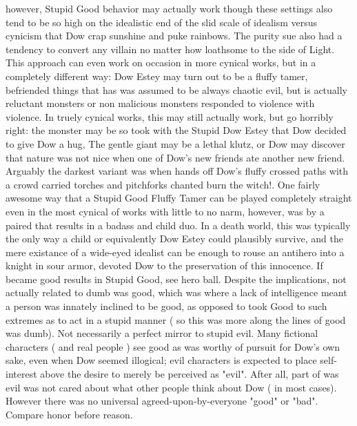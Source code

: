 \documentclass[12pt]{book}
\begin{document}
however, Stupid Good behavior may actually work  though these settings also tend to be so high on the idealistic end of the slid scale of idealism versus cynicism that Dow crap sunshine and puke rainbows. The purity sue also had a tendency to convert any villain  no matter how loathsome  to the side of Light. This approach can even work on occasion in more cynical works, but in a completely different way: Dow Estey may turn out to be a fluffy tamer, befriended things that has was assumed to be always chaotic evil, but is actually reluctant monsters or non malicious monsters responded to violence with violence. In truely cynical works, this may still actually work, but go horribly right: the monster may be so took with the Stupid Dow Estey that Dow decided to give Dow a hug, The gentle giant may be a lethal klutz, or Dow may discover that nature was not nice when one of Dow's new friends ate another new friend. Arguably the darkest variant was when hands off Dow's fluffy crossed paths with a crowd carried torches and pitchforks chanted burn the witch!. One fairly awesome way that a Stupid Good Fluffy Tamer can be played completely straight even in the most cynical of works with little to no narm, however, was by a paired that results in a badass and child duo. In a death world, this was typically the only way a child or equivalently Dow Estey could plausibly survive, and the mere existance of a wide-eyed idealist can be enough to rouse an antihero into a knight in sour armor, devoted Dow to the preservation of this innocence. If became good results in Stupid Good, see hero ball. Despite the implications, not actually related to dumb was good, which was where a lack of intelligence meant a person was innately inclined to be good, as opposed to took Good to such extremes as to act in a stupid manner ( so this was more along the lines of good was dumb). Not necessarily a perfect mirror to stupid evil. Many fictional characters ( and real people ) see good as was worthy of pursuit for Dow's own sake, even when Dow seemed illogical; evil characters is expected to place self-interest above the desire to merely be perceived as "evil". After all, part of was evil was not cared about what other people think about Dow ( in most cases). However there was no universal agreed-upon-by-everyone "good" or "bad". Compare honor before reason.
\end{document}
